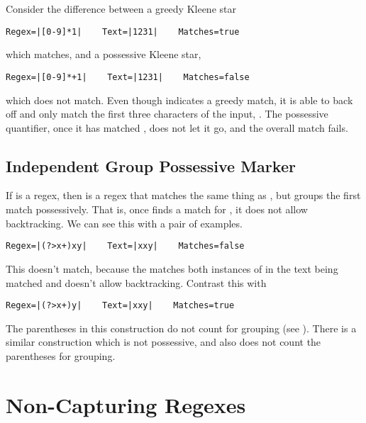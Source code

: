 Consider the difference between a greedy Kleene star
%
\begin{verbatim}
Regex=|[0-9]*1|    Text=|1231|    Matches=true
\end{verbatim}
%
which matches, and a possessive Kleene star,
%
\begin{verbatim}
Regex=|[0-9]*+1|    Text=|1231|    Matches=false
\end{verbatim}
%
which does not match.  Even though \code{[0-9]*} indicates a greedy
match, it is able to back off and only match the first three
characters of the input, .  The possessive quantifier, once
it has matched , does not let it go, and the overall match
fails.

\subsection{Independent Group Possessive Marker}

If  is a regex, then  is a regex that
matches the same thing as , but groups the first match
possessively.  That is, once  finds a match
for , it does not allow backtracking.   We can see this
with a pair of examples.
%
\begin{verbatim}
Regex=|(?>x+)xy|    Text=|xxy|    Matches=false
\end{verbatim}
%
This doesn't match, because the  matches both
instances of  in the text being matched and doesn't
allow backtracking.  Contrast this with
%
\begin{verbatim}
Regex=|(?>x+)y|    Text=|xxy|    Matches=true
\end{verbatim}

The parentheses in this construction do not count for grouping
(see ).  There is a similar construction
 which is not possessive, and also does
not count the parentheses for grouping.  




\section{Non-Capturing Regexes}

